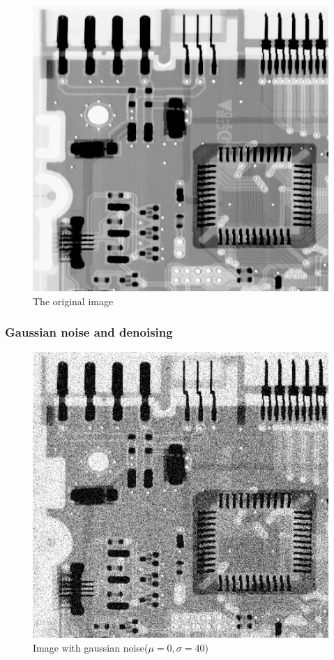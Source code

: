 \documentclass{article}
\begin{document}
\begin{figure}[]
	\centering
	\includegraphics[width=336pt]{../img/task_2.png}
	\caption{The original image}
\end{figure}

\subsubsection{Gaussian noise and denoising}

\begin{figure}[]
	\centering
	\includegraphics[width=336pt]{../result/task2/gauss/gauss-0-40.png}
	\caption{Image with gaussian noise($\mu = 0, \sigma = 40$)}
	\label{fig:gauss}
\end{figure}
\end{document}
